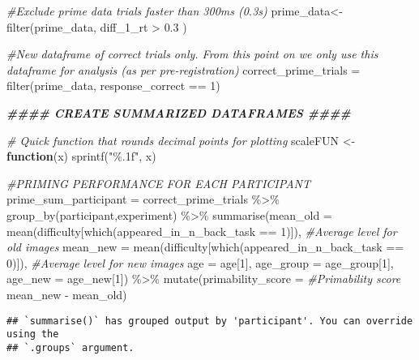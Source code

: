 \documentclass[
]{article}
\newenvironment{Shaded}{\begin{snugshade}}{\end{snugshade}}
\newcommand{\AttributeTok}[1]{\textcolor[rgb]{0.77,0.63,0.00}{#1}}
\newcommand{\CommentTok}[1]{\textcolor[rgb]{0.56,0.35,0.01}{\textit{#1}}}
\newcommand{\ControlFlowTok}[1]{\textcolor[rgb]{0.13,0.29,0.53}{\textbf{#1}}}
\newcommand{\DecValTok}[1]{\textcolor[rgb]{0.00,0.00,0.81}{#1}}
\newcommand{\DocumentationTok}[1]{\textcolor[rgb]{0.56,0.35,0.01}{\textbf{\textit{#1}}}}
\newcommand{\FloatTok}[1]{\textcolor[rgb]{0.00,0.00,0.81}{#1}}
\newcommand{\FunctionTok}[1]{\textcolor[rgb]{0.00,0.00,0.00}{#1}}
\newcommand{\NormalTok}[1]{#1}
\newcommand{\OtherTok}[1]{\textcolor[rgb]{0.56,0.35,0.01}{#1}}
\newcommand{\SpecialCharTok}[1]{\textcolor[rgb]{0.00,0.00,0.00}{#1}}
\newcommand{\StringTok}[1]{\textcolor[rgb]{0.31,0.60,0.02}{#1}}
\begin{document}
\begin{Shaded}
\begin{Highlighting}[]
\CommentTok{\#Exclude prime data trials faster than 300ms (0.3s) }
\NormalTok{prime\_data}\OtherTok{\textless{}{-}} \FunctionTok{filter}\NormalTok{(prime\_data, diff\_1\_rt }\SpecialCharTok{\textgreater{}} \FloatTok{0.3}\NormalTok{ )}

\CommentTok{\#New dataframe of correct trials only. From this point on we only use this dataframe for analysis (as per pre{-}registration)}
\NormalTok{correct\_prime\_trials }\OtherTok{=} \FunctionTok{filter}\NormalTok{(prime\_data, response\_correct }\SpecialCharTok{==} \DecValTok{1}\NormalTok{)}

\DocumentationTok{\#\#\#\# CREATE SUMMARIZED DATAFRAMES \#\#\#\#}

\CommentTok{\# Quick function that rounds decimal points for plotting}
\NormalTok{scaleFUN }\OtherTok{\textless{}{-}} \ControlFlowTok{function}\NormalTok{(x) }\FunctionTok{sprintf}\NormalTok{(}\StringTok{"\%.1f"}\NormalTok{, x)}

\CommentTok{\#PRIMING PERFORMANCE FOR EACH PARTICIPANT}
\NormalTok{prime\_sum\_participant }\OtherTok{=}\NormalTok{ correct\_prime\_trials }\SpecialCharTok{\%\textgreater{}\%} 
  \FunctionTok{group\_by}\NormalTok{(participant,experiment) }\SpecialCharTok{\%\textgreater{}\%} 
  \FunctionTok{summarise}\NormalTok{(}\AttributeTok{mean\_old =} \FunctionTok{mean}\NormalTok{(difficulty[}\FunctionTok{which}\NormalTok{(appeared\_in\_n\_back\_task }\SpecialCharTok{==} \DecValTok{1}\NormalTok{)]), }\CommentTok{\#Average level for old images}
            \AttributeTok{mean\_new =} \FunctionTok{mean}\NormalTok{(difficulty[}\FunctionTok{which}\NormalTok{(appeared\_in\_n\_back\_task }\SpecialCharTok{==} \DecValTok{0}\NormalTok{)]), }\CommentTok{\#Average level for new images}
            \AttributeTok{age =}\NormalTok{ age[}\DecValTok{1}\NormalTok{],}
            \AttributeTok{age\_group =}\NormalTok{ age\_group[}\DecValTok{1}\NormalTok{],}
            \AttributeTok{age\_new =}\NormalTok{ age\_new[}\DecValTok{1}\NormalTok{]) }\SpecialCharTok{\%\textgreater{}\%} 
  \FunctionTok{mutate}\NormalTok{(}\AttributeTok{primability\_score =} \CommentTok{\#Primability score }
\NormalTok{           mean\_new }\SpecialCharTok{{-}}\NormalTok{ mean\_old) }
\end{Highlighting}
\end{Shaded}

\begin{verbatim}
## `summarise()` has grouped output by 'participant'. You can override using the
## `.groups` argument.
\end{verbatim}
\end{document}
